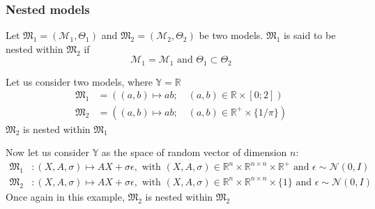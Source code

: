 \documentclass[a4paper,11pt]{article}
\newcommand{\Yspace}{\mathbb{Y}}
\theoremstyle{defi}
\numberwithin{thmCounter}{section}
\begin{document}
\subsubsection{Nested models}
\begin{definition}
  Let $\mathfrak{M}_1=(\mathcal{M}_1, \Theta_1)$ and $\mathfrak{M}_2=(\mathcal{M}_2, \Theta_2)$ be two models.
$\mathfrak{M}_1$ is said to be nested within $\mathfrak{M}_2$ if
\begin{equation*}
  \mathcal{M}_1 = \mathcal{M}_1 \text{ and } \Theta_1 \subset \Theta_2
\end{equation*}
\end{definition}
\begin{example}
  Let us consider two models, where $\Yspace = \mathbb{R}$
  \begin{align*}
    \mathfrak{M}_1 &= \left((a,b) \mapsto ab;\quad (a,b) \in \mathbb{R} \times [0;2]\right) \\
   \mathfrak{M}_2 &= \left((a,b) \mapsto ab;\quad (a,b) \in \mathbb{R}^+ \times \{1/\pi\}\right)
  \end{align*}
$\mathfrak{M}_2$ is nested within $\mathfrak{M}_1$
\end{example}
\begin{example}
  Now let us consider $\Yspace$ as the space of random vector of dimension $n$:
  \begin{align*}
    \mathfrak{M}_1 &: (X, A, \sigma) \mapsto AX + \sigma\epsilon, \text{ with } (X, A, \sigma)\in\mathbb{R}^n \times \mathbb{R}^{n\times n} \times \mathbb{R}^+ \text{ and } \epsilon \sim \mathcal{N}(0, I) \\
    \mathfrak{M}_2 &: (X, A, \sigma) \mapsto AX + \sigma\epsilon, \text{ with } (X, A, \sigma)\in\mathbb{R}^n \times \mathbb{R}^{n\times n} \times \{1\} \text{ and } \epsilon \sim \mathcal{N}(0, I)
  \end{align*}
Once again in this example,  $\mathfrak{M}_2$ is nested within $\mathfrak{M}_2$
\end{example}
\end{document}
